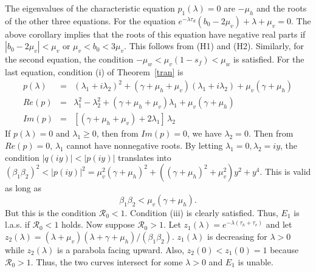 \documentclass[12pt,leqno]{article}
\begin{document}
The eigenvalues of the characteristic equation $p_1(\lambda)=0$ are $-\mu_h$ and the roots of the other three equations. For the equation $e^{-\lambda \tau_d} (b_0-2\mu_v) + \lambda + \mu_v = 0$. The above corollary implies that the roots of this equation have negative real parts if $|b_0-2 \mu_v|< \mu_v$ or $\mu_v < b_0 < 3\mu_v$. This follows from (H1) and (H2). Similarly, for the second equation, the condition $-\mu_w < \mu_v(1-s_f)<\mu_w$ is satisfied. For the last equation, condition (i) of Theorem~\ref{tran} is 
\begin{eqnarray*}
p(\lambda) &=&  (\lambda_1+i\lambda_2)^2 + (\gamma + \mu_h + \mu_v)(\lambda_1 + i\lambda_2) + \mu_v(\gamma + \mu_h) \\
Re(p) &=& \lambda_1^2 - \lambda_2^2 + (\gamma+\mu_h+\mu_v)\lambda_1 + \mu_v(\gamma + \mu_h)\\
Im(p) &=& [(\gamma+\mu_h+\mu_v) + 2\lambda_1]\,\lambda_2
\end{eqnarray*}
If $p(\lambda) = 0$ and $\lambda_1 \geq 0$, then from $Im(p) = 0$, we have $\lambda_2 = 0$. Then from $Re(p) = 0$, $\lambda_1$ cannot have nonnegative roots. By letting $\lambda_1=0, \lambda_2=iy$, the condition $|q(iy)| < |p(iy)|$ translates into $(\beta_1\beta_2)^2 < |p(iy)|^2 = \mu_v^2(\gamma+\mu_h)^2 + ((\gamma+\mu_h)^2+\mu_v^2)y^2 + y^4$. This is valid as long as
\begin{equation*}
\beta_1\beta_2 < \mu_v(\gamma+\mu_h).
\end{equation*}
But this is the condition $\mathcal{R}_0 < 1$. 
Condition (iii) is clearly satisfied. Thus, $E_1$ is l.a.s. if $\mathcal{R}_0 < 1$ holds. Now suppose $\mathcal{R}_0 > 1$.  Let $z_1(\lambda) = e^{-\lambda(\tau_h+\tau_v)}$ and let $z_2(\lambda) = (\lambda+\mu_v)(\lambda+\gamma+\mu_h)/(\beta_1\beta_2)$. $z_1(\lambda)$ is decreasing for $\lambda>0$ while $z_2(\lambda)$ is a parabola facing upward. Also, $z_2(0) < z_1(0) = 1$ because $\mathcal{R}_0 > 1$. Thus, the two curves intersect for some $\lambda > 0$ and $E_1$ is unable. \smallskip
\end{document}
